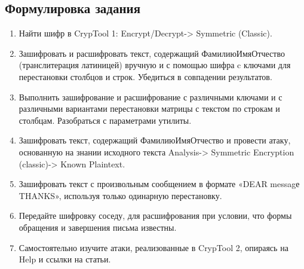 \documentclass[a4paper, 14pt]{extarticle}
\begin{document}
\subsection{Формулировка задания}
\begin{enumerate}
    \item Найти шифр в CrypTool 1: Encrypt/Decrypt-> Symmetric (Classic).
    \item Зашифровать и расшифровать текст, содержащий ФамилиюИмяОтчество (транслитерация латиницей) вручную и с помощью шифра c ключами для перестановки столбцов и строк. Убедиться в совпадении результатов.
    \item Выполнить зашифрование и расшифрование с различными ключами и с различными вариантами перестановки матрицы с текстом по строкам и столбцам. Разобраться с параметрами утилиты.
    \item Зашифровать текст, содержащий ФамилиюИмяОтчество и провести атаку, основанную на знании исходного текста Analysis-> Symmetric Encryption (classic)-> Known Plaintext. 
    \item Зашифровать текст с произвольным сообщением в формате «DEAR messagе THANKS», используя только одинарную перестановку.
    \item Передайте шифровку соседу, для расшифрования при условии, что формы обращения и завершения письма известны.
    \item Самостоятельно изучите атаки, реализованные в CrypTool 2, опираясь на Help и ссылки на статьи.
\end{enumerate}
\end{document}

